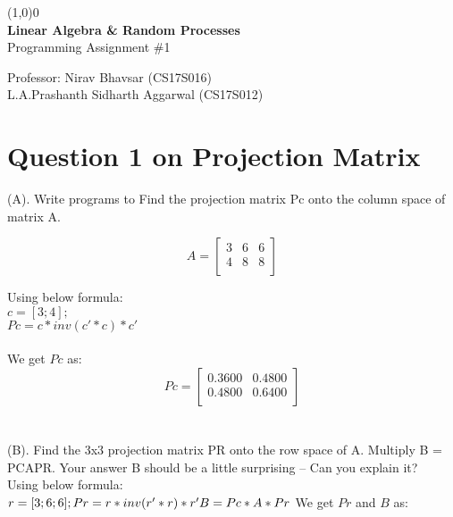 \documentclass[12pt]{report}
\begin{document}
\begin{titlepage}
	\begin{center}
		\line(1,0){0}\\
		[4cm]
		\huge{\bfseries Linear Algebra \& Random Processes} \\
		[0.5cm]
		Programming Assignment \#1 \\
		[10cm]
	\end{center}
	\begin{center}
		
			\Large{
			  Professor:  \hfill  Nirav Bhavsar (CS17S016)\\
		  L.A.Prashanth  \hfill  Sidharth Aggarwal (CS17S012)\\
			}
	
	
	\end{center}
	
\end{titlepage}


\setcounter{page}{1}

\setcounter{chapter}{1}

\section*{\LARGE Question 1 on Projection Matrix}

(A). Write programs to Find the projection matrix Pc onto the column space of matrix A.


\[A = \begin{bmatrix}
3&6&6\\
4&8&8\\
\end{bmatrix}\]

\noindent
Using below formula:\\
$ c = [3; 4]; $\\
$Pc =  c*inv(c'*c)*c' $\\ \\
We get $ Pc $ as:
\[Pc = \begin{bmatrix}
0.3600   & 0.4800\\
0.4800  &  0.6400\\
\end{bmatrix}\]\\
\noindent
\\
(B). Find the 3x3 projection matrix PR onto the row space of A. Multiply B = PCAPR. Your answer B should be a little surprising -- Can you explain it? \\

\noindent
Using below formula:\\
$ r = [3; 6; 6];\\
Pr =  r*inv(r'*r)*r'\\
B = Pc*A*Pr\\ \\ $
We get $ Pr $ and $ B $ as:
\end{document}
